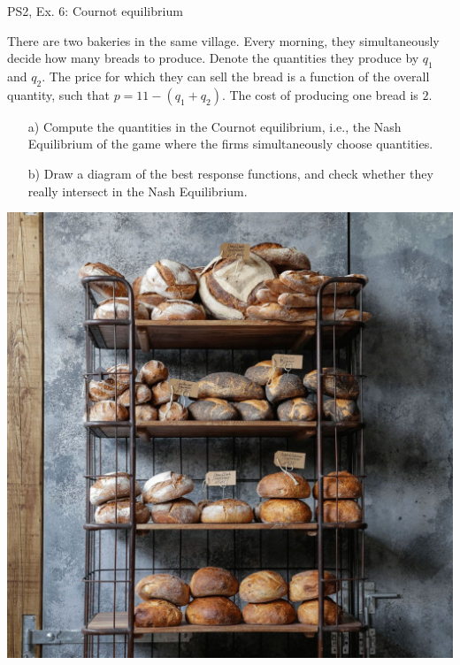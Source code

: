 \begin{frame}{PS2, Ex. 6: Cournot equilibrium}
  \begin{multicols}{2}
    There are two bakeries in the same village. Every morning, they simultaneously decide how many breads to produce. Denote the quantities they produce by $q_1$ and $q_2$. The price for which they can sell the bread is a function of the overall quantity, such that $p=11-(q_1+q_2)$. The cost of producing one bread is $2$.
    \begin{itemize}
      \item[a)] Compute the quantities in the Cournot equilibrium, i.e., the Nash Equilibrium of the game where the firms simultaneously choose quantities.
      \item[b)]  Draw a diagram of the best response functions, and check whether they really intersect in the Nash Equilibrium.
    \end{itemize}
  \vfill\null \columnbreak
   \includegraphics[width=.5 \textwidth]{figures/bread}
  \vfill\null
  \end{multicols}
\end{frame}

